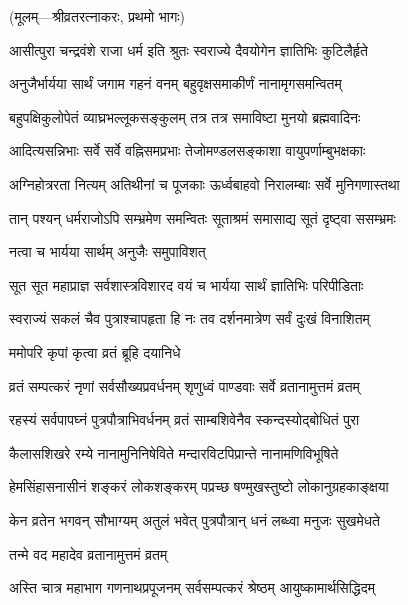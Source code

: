 \centerline{\small{(मूलम्—श्रीव्रतरत्नाकरः, प्रथमो भागः)}}

\twolineshloka
{आसीत्पुरा चन्द्रवंशे राजा धर्म इति श्रुतः}
{स्वराज्ये दैवयोगेन ज्ञातिभिः कुटिलैर्हृते} %

\twolineshloka
{अनुजैर्भार्यया सार्थं जगाम गहनं वनम्}
{बहुवृक्षसमाकीर्णं नानामृगसमन्वितम्} %

\twolineshloka
{बहुपक्षिकुलोपेतं व्याघ्रभल्लूकसङ्कुलम्}
{तत्र तत्र समाविष्टा मुनयो ब्रह्मवादिनः} %

\twolineshloka
{आदित्यसन्निभाः सर्वे सर्वे वह्निसमप्रभाः}
{तेजोमण्डलसङ्काशा वायुपर्णाम्बुभक्षकाः} %

\twolineshloka
{अग्निहोत्ररता नित्यम् अतिथीनां च पूजकाः}
{ऊर्ध्वबाहवो निरालम्बाः सर्वे मुनिगणास्तथा} %

\twolineshloka
{तान् पश्यन् धर्मराजोऽपि सम्भ्रमेण समन्वितः}
{सूताश्रमं समासाद्य सूतं दृष्ट्वा ससम्भ्रमः} %

\onelineshloka
{नत्वा च भार्यया सार्थम् अनुजैः समुपाविशत्} %


\twolineshloka
{सूत सूत महाप्राज्ञ सर्वशास्त्रविशारद}
{वयं च भार्यया सार्थं ज्ञातिभिः परिपीडिताः} %

\twolineshloka
{स्वराज्यं सकलं चैव पुत्राश्चापहृता हि नः}
{तव दर्शनमात्रेण सर्वं दुःखं विनाशितम्} %

\onelineshloka
{ममोपरि कृपां कृत्वा व्रतं ब्रूहि दयानिधे} %


\twolineshloka
{व्रतं सम्पत्करं नृणां सर्वसौख्यप्रवर्धनम्}
{शृणुध्वं पाण्डवाः सर्वे व्रतानामुत्तमं व्रतम्} %

\twolineshloka
{रहस्यं सर्वपापघ्नं पुत्रपौत्राभिवर्धनम्}
{व्रतं साम्बशिवेनैव स्कन्दस्योद्बोधितं पुरा} %

\twolineshloka
{कैलासशिखरे रम्ये नानामुनिनिषेविते}
{मन्दारविटपिप्रान्ते नानामणिविभूषिते} %

\twolineshloka
{हेमसिंहासनासीनं शङ्करं लोकशङ्करम्}
{पप्रच्छ षण्मुखस्तुष्टो लोकानुग्रहकाङ्क्षया} %


\twolineshloka
{केन व्रतेन भगवन् सौभाग्यम् अतुलं भवेत्}
{पुत्रपौत्रान् धनं लब्ध्वा मनुजः सुखमेधते} %

\onelineshloka
{तन्मे वद महादेव व्रतानामुत्तमं व्रतम्} %


\twolineshloka
{अस्ति चात्र महाभाग गणनाथप्रपूजनम्}
{सर्वसम्पत्करं श्रेष्ठम् आयुष्कामार्थसिद्धिदम्} %

